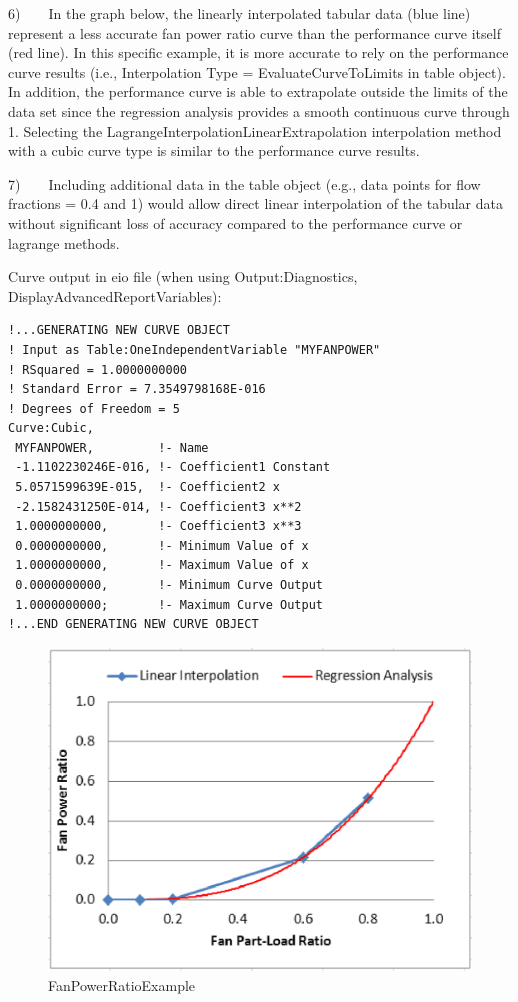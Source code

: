 6)~~~~In the graph below, the linearly interpolated tabular data (blue line) represent a less accurate fan power ratio curve than the performance curve itself (red line). In this specific example, it is more accurate to rely on the performance curve results (i.e., Interpolation Type = EvaluateCurveToLimits in table object). In addition, the performance curve is able to extrapolate outside the limits of the data set since the regression analysis provides a smooth continuous curve through 1. Selecting the LagrangeInterpolationLinearExtrapolation interpolation method with a cubic curve type is similar to the performance curve results.

7)~~~~Including additional data in the table object (e.g., data points for flow fractions = 0.4 and 1) would allow direct linear interpolation of the tabular data without significant loss of accuracy compared to the performance curve or lagrange methods.

Curve output in eio file (when using Output:Diagnostics, DisplayAdvancedReportVariables):

\begin{lstlisting}
!...GENERATING NEW CURVE OBJECT
! Input as Table:OneIndependentVariable "MYFANPOWER"
! RSquared = 1.0000000000
! Standard Error = 7.3549798168E-016
! Degrees of Freedom = 5
Curve:Cubic,
 MYFANPOWER,         !- Name
 -1.1102230246E-016, !- Coefficient1 Constant
 5.0571599639E-015,  !- Coefficient2 x
 -2.1582431250E-014, !- Coefficient3 x**2
 1.0000000000,       !- Coefficient3 x**3
 0.0000000000,       !- Minimum Value of x
 1.0000000000,       !- Maximum Value of x
 0.0000000000,       !- Minimum Curve Output
 1.0000000000;       !- Maximum Curve Output
!...END GENERATING NEW CURVE OBJECT
\end{lstlisting}

\begin{figure}[htbp]
\centering
\includegraphics{media/image7870.png}
\caption{FanPowerRatioExample}
\end{figure}

